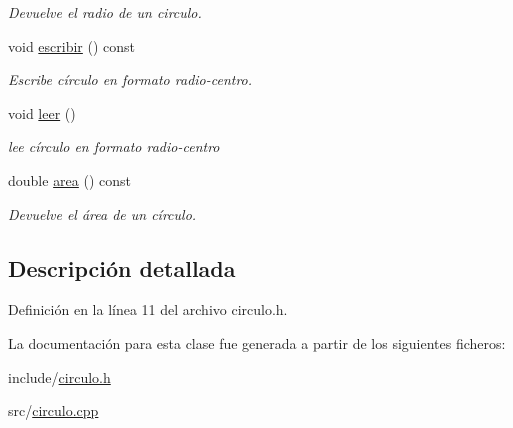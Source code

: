 \begin{DoxyCompactItemize}
\begin{DoxyCompactList}\small\item\em Devuelve el radio de un circulo. \end{DoxyCompactList}\item 
void \hyperlink{classCirculo_a2deaed49ea394702beb0554f9480137e}{escribir} () const \hypertarget{classCirculo_a2deaed49ea394702beb0554f9480137e}{}\label{classCirculo_a2deaed49ea394702beb0554f9480137e}

\begin{DoxyCompactList}\small\item\em Escribe círculo en formato radio-\/centro. \end{DoxyCompactList}\item 
void \hyperlink{classCirculo_aa71efffb3b42eeaefd43743a8d34aa74}{leer} ()\hypertarget{classCirculo_aa71efffb3b42eeaefd43743a8d34aa74}{}\label{classCirculo_aa71efffb3b42eeaefd43743a8d34aa74}

\begin{DoxyCompactList}\small\item\em lee círculo en formato radio-\/centro \end{DoxyCompactList}\item 
double \hyperlink{classCirculo_a532d4f2bd03b688403c4370319411dc3}{area} () const \hypertarget{classCirculo_a532d4f2bd03b688403c4370319411dc3}{}\label{classCirculo_a532d4f2bd03b688403c4370319411dc3}

\begin{DoxyCompactList}\small\item\em Devuelve el área de un círculo. \end{DoxyCompactList}\end{DoxyCompactItemize}


\subsection{Descripción detallada}


Definición en la línea 11 del archivo circulo.\+h.



La documentación para esta clase fue generada a partir de los siguientes ficheros\+:\begin{DoxyCompactItemize}
\item 
include/\hyperlink{circulo_8h}{circulo.\+h}\item 
src/\hyperlink{circulo_8cpp}{circulo.\+cpp}\end{DoxyCompactItemize}
